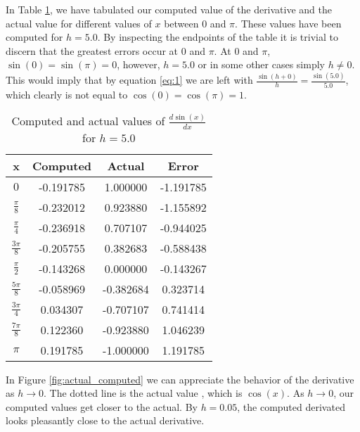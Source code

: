 \documentclass{article}
\begin{document}
In Table \ref{table:comparison}, we have tabulated our computed value of the derivative and the actual value for
different values of $x$ between $0$ and $\pi$. These values have been computed for $h=5.0$. By inspecting the endpoints
of the table it is trivial to discern that the greatest errors occur at $0$ and $\pi$. At $0$ and $\pi$, $\sin(0) = \sin(\pi) = 0$,
however, $h=5.0$ or in some other cases simply $h\ne0$. This would imply that by equation \ref{eq:1} we are left with $\frac{\sin(h+0)}{h}=\frac{\sin(5.0)}{5.0}$, which
clearly is not equal to $\cos(0) = \cos(\pi) = 1$.

\begin{table}[H]
  \begin{center}
    \begin{tabular}{|c|c|c|c|}
      \hline
      x & Computed & Actual & Error \\
      \hline
      \( 0 \) & -0.191785 & 1.000000 & -1.191785 \\
      \hline
      \( \frac{\pi}{8} \) & -0.232012 & 0.923880 & -1.155892 \\
      \hline
      \( \frac{\pi}{4} \) & -0.236918 & 0.707107 & -0.944025 \\
      \hline
      \( \frac{3 \pi}{8} \) & -0.205755 & 0.382683 & -0.588438 \\
      \hline
      \( \frac{\pi}{2} \) & -0.143268 & 0.000000 & -0.143267 \\
      \hline
      \( \frac{5 \pi}{8} \) & -0.058969 & -0.382684 & 0.323714 \\
      \hline
      \( \frac{3 \pi}{4} \) & 0.034307 & -0.707107 & 0.741414 \\
      \hline
      \( \frac{7 \pi}{8} \) & 0.122360 & -0.923880 & 1.046239 \\
      \hline
      \( \pi \) & 0.191785 & -1.000000 & 1.191785 \\
      \hline
    \end{tabular}
  \end{center}
  \caption {Computed and actual values of \( \frac{d \sin(x)}{dx} \) for $h=5.0$}
  \label{table:comparison}
\end{table}

In Figure \ref{fig:actual_computed} we can appreciate the behavior of the derivative as
$h \to 0$. The dotted line is the actual value , which is $\cos(x)$. As $h \to 0$, our computed values
get closer to the actual. By $h=0.05$, the computed derivated looks pleasantly close to the actual derivative.
\end{document}
